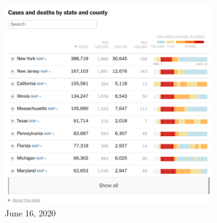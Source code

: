 \documentclass[article]{jdssv}\usepackage[]{graphicx}\usepackage[]{color}
\begin{document}
% 
% 

\begin{figure}
\centering
\begin{subfigure}[t]{.25\textwidth}
\includegraphics[width=\textwidth]{nyt-wayback-20200616}
\caption{June 16, 2020}\label{fig:nyt-colors1}
\end{subfigure}\hfill
\begin{subfigure}[t]{.25\textwidth}

\end{subfigure}
\end{figure}
\end{document}
